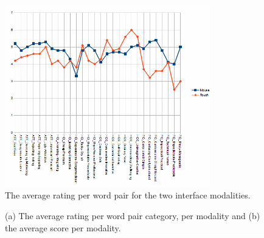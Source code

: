 \documentclass[a4paper,10pt]{report}
\begin{document}
\begin{figure}
  \centering
  \includegraphics[width=0.8\textwidth]{images/pairs}
  \caption{The average rating per word pair for the two interface modalities.}
  \label{fig:pairs}
\end{figure}

\begin{figure}
  \caption{(a) The average rating per word pair category, per modality and (b) the average score per modality.}
\end{figure}
\end{document}
